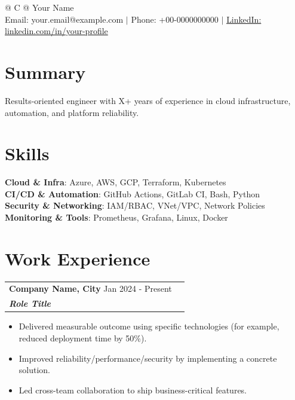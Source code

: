 \documentclass[a4paper,10pt]{article}
\begin{document}
\pagestyle{empty}

\begin{tabularx}{\linewidth}{@{} C @{}}
\color[HTML]{1C033C} \Huge{Your Name}\\[6pt]
\textcolor[HTML]{371e77}{Email: your.email@example.com $|$}
\textcolor[HTML]{371e77}{Phone: +00-0000000000} $|$
\textcolor[HTML]{371e77}{\underline{LinkedIn: linkedin.com/in/your-profile}}
\end{tabularx}

\section{Summary}
Results-oriented engineer with X+ years of experience in cloud infrastructure, automation, and platform reliability.

\section{Skills}
\begin{itemize}[leftmargin=0.15in, label={}]
  \small{\item{
    \textbf{Cloud \& Infra}{: Azure, AWS, GCP, Terraform, Kubernetes} \\
    \textbf{CI/CD \& Automation}{: GitHub Actions, GitLab CI, Bash, Python} \\
    \textbf{Security \& Networking}{: IAM/RBAC, VNet/VPC, Network Policies} \\
    \textbf{Monitoring \& Tools}{: Prometheus, Grafana, Linux, Docker}
  }}
\end{itemize}

\section{Work Experience}

\begin{tabularx}{\linewidth}{ @{}l r@{} }
\color[HTML]{1C033C} \textbf{Company Name, City} \hfill \color[HTML]{371e77} Jan 2024 - Present \\
\color[HTML]{371e77}\textbf{\textit{Role Title}} \hfill \color[HTML]{371e77}\\[3pt]
\end{tabularx}
\begin{itemize}[nosep, leftmargin=2em, itemsep=2pt]
  \item Delivered measurable outcome using specific technologies (for example, reduced deployment time by 50\%).
  \item Improved reliability/performance/security by implementing a concrete solution.
  \item Led cross-team collaboration to ship business-critical features.
\end{itemize}
\end{document}
